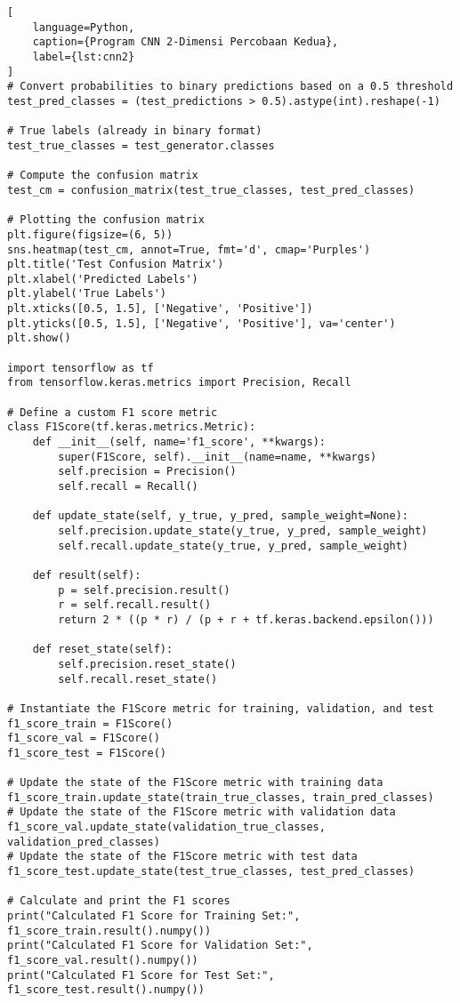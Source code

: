 \begin{lstlisting}[
    language=Python,
    caption={Program CNN 2-Dimensi Percobaan Kedua},
    label={lst:cnn2}
]
# Convert probabilities to binary predictions based on a 0.5 threshold
test_pred_classes = (test_predictions > 0.5).astype(int).reshape(-1)

# True labels (already in binary format)
test_true_classes = test_generator.classes

# Compute the confusion matrix
test_cm = confusion_matrix(test_true_classes, test_pred_classes)

# Plotting the confusion matrix
plt.figure(figsize=(6, 5))
sns.heatmap(test_cm, annot=True, fmt='d', cmap='Purples')
plt.title('Test Confusion Matrix')
plt.xlabel('Predicted Labels')
plt.ylabel('True Labels')
plt.xticks([0.5, 1.5], ['Negative', 'Positive'])
plt.yticks([0.5, 1.5], ['Negative', 'Positive'], va='center')
plt.show()

import tensorflow as tf
from tensorflow.keras.metrics import Precision, Recall

# Define a custom F1 score metric
class F1Score(tf.keras.metrics.Metric):
    def __init__(self, name='f1_score', **kwargs):
        super(F1Score, self).__init__(name=name, **kwargs)
        self.precision = Precision()
        self.recall = Recall()

    def update_state(self, y_true, y_pred, sample_weight=None):
        self.precision.update_state(y_true, y_pred, sample_weight)
        self.recall.update_state(y_true, y_pred, sample_weight)

    def result(self):
        p = self.precision.result()
        r = self.recall.result()
        return 2 * ((p * r) / (p + r + tf.keras.backend.epsilon()))

    def reset_state(self):
        self.precision.reset_state()
        self.recall.reset_state()

# Instantiate the F1Score metric for training, validation, and test
f1_score_train = F1Score()
f1_score_val = F1Score()
f1_score_test = F1Score()

# Update the state of the F1Score metric with training data
f1_score_train.update_state(train_true_classes, train_pred_classes)
# Update the state of the F1Score metric with validation data
f1_score_val.update_state(validation_true_classes, validation_pred_classes)
# Update the state of the F1Score metric with test data
f1_score_test.update_state(test_true_classes, test_pred_classes)

# Calculate and print the F1 scores
print("Calculated F1 Score for Training Set:", f1_score_train.result().numpy())
print("Calculated F1 Score for Validation Set:", f1_score_val.result().numpy())
print("Calculated F1 Score for Test Set:", f1_score_test.result().numpy())


\end{lstlisting}
